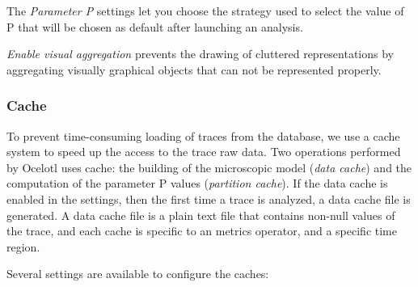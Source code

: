\documentclass[twoside]{article}
\begin{document}
\begin{sloppypar}
The \textit{Parameter P} settings let you choose the strategy used to select the value of P that will be chosen as default after launching an analysis.

\emph{Enable visual aggregation} prevents the drawing of cluttered representations by aggregating visually graphical objects that can not be represented properly.

\subsubsection{Cache}
To prevent time-consuming loading of traces from the database, we use a cache system to speed up the access to the trace raw data. Two operations performed by Ocelotl uses cache: the building of the microscopic model (\emph{data cache}) and the computation of the parameter P values (\emph{partition cache}). If the data cache is enabled in the settings, then the first time a trace is analyzed, a data cache file is generated. A data cache file is a plain text file that contains non-null values of the trace, and each cache is specific to an metrics operator, and a specific time region. 

Several settings are available to configure the caches:
\begin{itemize}


\end{itemize}
\end{sloppypar}
\end{document}
